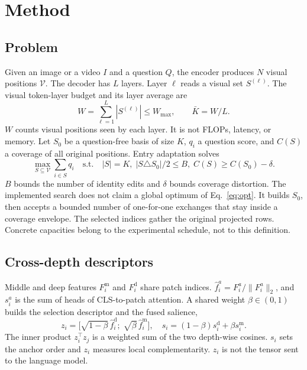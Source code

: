 \section{Method}
\label{sec:method}

\subsection{Problem}
Given an image or a video $I$ and a question $Q$, the encoder produces $N$ visual positions $\mathcal{V}$. The decoder has $L$ layers. Layer $\ell$ reads a visual set $S^{(\ell)}$. The visual token-layer budget and its layer average are
\begin{equation}
W=\sum_{\ell=1}^{L}|S^{(\ell)}|\le W_{\max},\qquad \bar K=W/L.
\label{eq:budget}
\end{equation}
$W$ counts visual positions seen by each layer. It is not FLOPs, latency, or memory. Let $S_0$ be a question-free basis of size $K$, $q_i$ a question score, and $C(S)$ a coverage of all original positions. Entry adaptation solves
\begin{equation}
\max_{S\subseteq\mathcal{V}}\sum_{i\in S} q_i
\quad\text{s.t.}\quad
|S|=K,\;
|S\triangle S_0|/2\le B,\;
C(S)\ge C(S_0)-\delta.
\label{eq:opt}
\end{equation}
$B$ bounds the number of identity edits and $\delta$ bounds coverage distortion. The implemented search does not claim a global optimum of Eq.~\eqref{eq:opt}. It builds $S_0$, then accepts a bounded number of one-for-one exchanges that stay inside a coverage envelope. The selected indices gather the original projected rows. Concrete capacities belong to the experimental schedule, not to this definition.

\subsection{Cross-depth descriptors}
Middle and deep features $F_i^{\mathrm{m}}$ and $F_i^{\mathrm{d}}$ share patch indices. $\hat f_i^{a}=F_i^{a}/\|F_i^{a}\|_2$, and $s_i^{a}$ is the sum of heads of CLS-to-patch attention. A shared weight $\beta\in(0,1)$ builds the selection descriptor and the fused salience,
\begin{equation}
z_i=\bigl[\sqrt{1-\beta}\,\hat f_i^{\mathrm{d}};\;\sqrt{\beta}\,\hat f_i^{\mathrm{m}}\bigr],
\quad
s_i=(1-\beta)s_i^{\mathrm{d}}+\beta s_i^{\mathrm{m}}.
\label{eq:dual}
\end{equation}
The inner product $z_i^{\top}z_j$ is a weighted sum of the two depth-wise cosines. $s_i$ sets the anchor order and $z_i$ measures local complementarity. $z_i$ is not the tensor sent to the language model.

